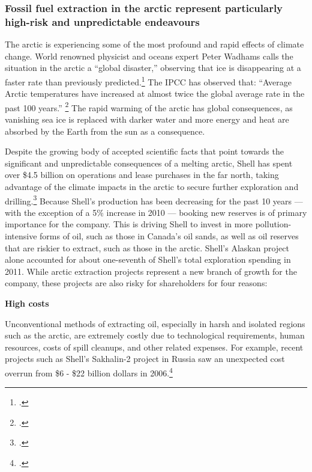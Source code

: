	\subsubsection{Fossil fuel extraction in the arctic represent particularly high-risk and unpredictable endeavours}



The arctic is experiencing some of the most profound and rapid effects of climate change.
World renowned physicist and oceans expert Peter Wadhams calls the situation in the arctic a ``global disaster,'' observing that ice is disappearing at a faster rate than previously predicted.\footcite{Wadhams2012}
The IPCC has observed that: ``Average Arctic temperatures have increased at almost twice the global average rate in the past 100 years.'' \footcite[][Climate Change 2007: Synthesis Report - Observed changes in climate and their effects]{IPCC2007}
The rapid warming of the arctic has global consequences, as vanishing sea ice is replaced with darker water and more energy and heat are absorbed by the Earth from the sun as a consequence.


Despite the growing body of accepted scientific facts that point towards the significant and unpredictable consequences of a melting arctic, Shell has spent over \$4.5 billion on operations and lease purchases in the far north, taking advantage of the climate impacts in the arctic to secure further exploration and drilling.\footcite{ShellSuspends}
Because Shell's production has been decreasing for the past 10 years --- with the exception of a 5\% increase in 2010  --- booking new reserves is of primary importance for the company.
This is driving Shell to invest in more pollution-intensive forms of oil, such as those in Canada's oil sands, as well as oil reserves that are riskier to extract, such as those in the arctic.
Shell's Alaskan project alone accounted for about one-seventh of Shell's total exploration spending in 2011. 
While arctic extraction projects represent a new branch of growth for the company, these projects are also risky for shareholders for four reasons:



\textbf{High costs} 



Unconventional methods of extracting oil, especially in harsh and isolated regions such as the arctic, are extremely costly due to technological requirements, human resources, costs of spill cleanups, and other related expenses. 
For example, recent projects such as Shell's Sakhalin-2 project in Russia saw an unexpected cost overrun from \$6 - \$22 billion dollars in 2006.\footcite[For more on these four central risk factors see: ][]{OutInTheCold_2012}



